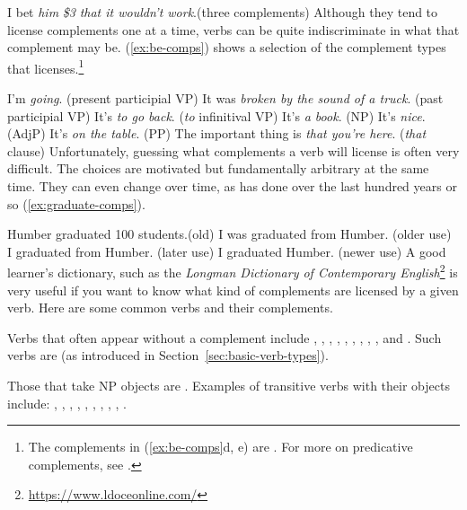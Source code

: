 \ea\label{ex:bet-comp}
\ea I bet \emph{him} \emph{\$3} \emph{that it wouldn't work}.\hfill(three complements)
\z\z
Although they tend to license complements one at a time, verbs can be quite indiscriminate in what that complement may be. (\ref{ex:be-comps}) shows a selection of the complement types that  licenses.\footnote{The complements in (\ref{ex:be-comps}d, e) are . For more on predicative complements, see \citet[251--272]{Huddleston2002}.}

\ea\label{ex:be-comps}
\ea I'm \emph{going}. \hfill (present participial VP)
\ex It was \emph{broken by the sound of a truck}. \hfill (past participial VP)
\ex It's \emph{to go back}. \hfill (\emph{to} infinitival VP)
\ex It's \emph{a book}. \hfill (NP)
\ex It's \emph{nice}. \hfill (AdjP)
\ex It's \emph{on the table}. \hfill (PP)
\ex The important thing is \emph{that you're here}. \hfill (\emph{that} clause)
\z
\z
Unfortunately, guessing what complements a verb will license is often very difficult. The choices are motivated but fundamentally arbitrary at the same time. They can even change over time, as  has done over the last hundred years or so (\ref{ex:graduate-comps}).

\ea\label{ex:graduate-comps}
\ea Humber graduated 100 students.\hfill(old)
\ex I was graduated from Humber.	\hfill(older use)
\ex I graduated from Humber. 	\hfill(later use)
\ex I graduated Humber. 	\hfill(newer use)
\z\z
A good learner's dictionary, such as the \textit{Longman Dictionary of Contemporary English}\footnote{\url{https://www.ldoceonline.com/}} is very useful if you want to know what kind of complements are licensed by a given verb. Here are some common verbs and their complements.

Verbs that often appear without a complement include , , , , , , , , , and . Such verbs are  (as introduced in Section~\ref{sec:basic-verb-types}).

Those that take NP objects are . Examples of transitive verbs with their objects include: , , , , , , , , , .

